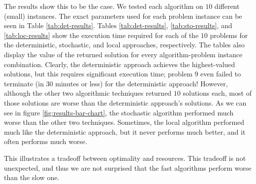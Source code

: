 \documentclass[../main.tex]{subfiles}
\begin{document}
The results show this to be the case. We tested each algorithm on $10$ different (small) \probs instances. The exact parameters used for each problem instance can be seen in Table \ref{tab:det-results}. Tables \ref{tab:det-results}, \ref{tab:sto-results}, and \ref{tab:loc-results} show the execution time required for each of the $10$ problems for the deterministic, stochastic, and local approaches, respectively. The tables also display the value of the returned solution for every algorithm-problem instance combination. Clearly, the deterministic approach achieves the highest-valued solutions, but this requires significant execution time; problem 9 even failed to terminate (in $30$ minutes or less) for the deterministic approach! However, although the other two algorithmic techniques returned $10$ solutions each, most of those solutions are worse than the deterministic approach's solutions. As we can see in figure \ref{fig:results-bar-chart}, the stochastic algorithm performed much worse than the other two techniques. Sometimes, the local algorithm performed much like the deterministic approach, but it never performs much better, and it often performs much worse.

This illustrates a tradeoff between optimality and resources. This tradeoff is not unexpected, and thus we are not surprised that the fast algorithms perform worse than the slow one.
\end{document}
